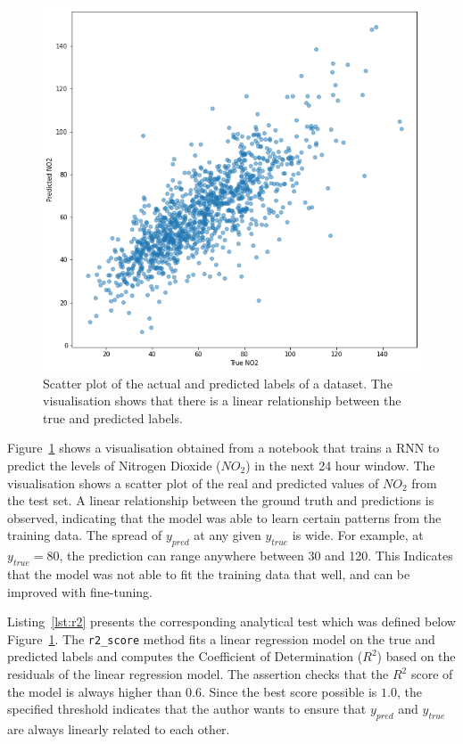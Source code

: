 \documentclass[conference]{IEEEtran}
\begin{document}
\begin{figure}
  \includegraphics[width=\linewidth]{../catalogue/select-332a.png}
  \caption{Scatter plot of the actual and predicted labels of a dataset. The visualisation shows that there is a linear relationship between the true and predicted labels.}\label{fig:r2}
\end{figure}

Figure~\ref{fig:r2} shows a visualisation obtained from a notebook that trains a RNN to predict the levels of Nitrogen Dioxide ($NO_2$) in the next 24 hour window. The visualisation shows a scatter plot of the real and predicted values of $NO_2$ from the test set. A linear relationship between the ground truth and predictions is observed, indicating that the model was able to learn certain patterns from the training data. The spread of $y_{pred}$ at any given $y_{true}$ is wide. For example, at $y_{true} = 80$, the prediction can range anywhere between 30 and 120. This Indicates that the model was not able to fit the training data that well, and can be improved with fine-tuning.

Listing~\ref{lst:r2} presents the corresponding analytical test which was defined below Figure~\ref{fig:r2}. The \texttt{r2\_score} method fits a linear regression model on the true and predicted labels and computes the Coefficient of Determination ($R^2$) based on the residuals of the linear regression model. The assertion checks that the $R^2$ score of the model is always higher than $0.6$. Since the best score possible is $1.0$, the specified threshold indicates that the author wants to ensure that $y_{pred}$ and $y_{true}$ are always linearly related to each other.
\end{document}
